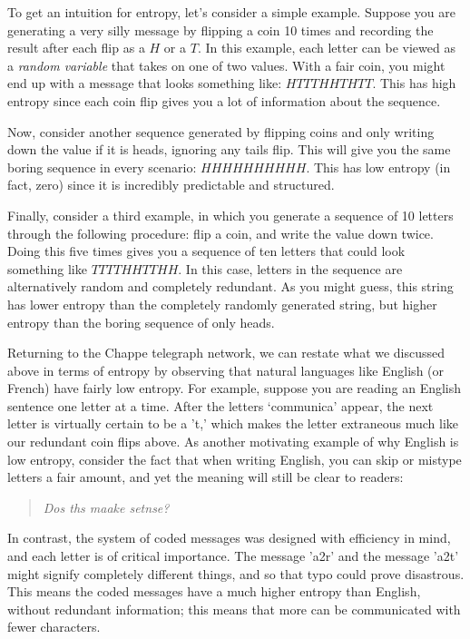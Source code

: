 \documentclass[UTF8]{book}
\begin{document}
\begin{CJK}{UTF8}{gbsn}
To get an intuition for entropy, let's consider a simple example. Suppose you are generating a very silly message by flipping a coin 10 times and recording the result after each flip as a $H$ or a $T$. In this example, each letter can be viewed as a \emph{random variable} that takes on one of two values. With a fair coin, you might end up with a message that looks something like: $HTTTHHTHTT$. This has high entropy since each coin flip gives you a lot of information about the sequence.

Now, consider another sequence generated by flipping coins and only writing down the value if it is heads, ignoring any tails flip. This will give you the same boring sequence in every scenario: $HHHHHHHHHH$. This has low entropy (in fact, zero) since it is incredibly predictable and structured.

Finally, consider a third example, in which you generate a sequence of 10 letters through the following procedure: flip a coin, and write the value down twice. Doing this five times gives you a sequence of ten letters that could look something like $TTTTHHTTHH$. In this case, letters in the sequence are alternatively random and completely redundant. As you might guess, this string has lower entropy than the completely randomly generated string, but higher entropy than the boring sequence of only heads.

Returning to the Chappe telegraph network, we can restate what we discussed above in terms of entropy by observing that natural languages like English (or French) have fairly low entropy. For example, suppose you are reading an English sentence one letter at a time. After the letters `communica' appear, the next letter is virtually certain to be a 't,' which makes the letter extraneous much like our redundant coin flips above. As another motivating example of why English is low entropy, consider the fact that when writing English, you can skip or mistype letters a fair amount, and yet the meaning will still be clear to readers:

\begin{quotation}
\centering
\emph{Dos ths maake setnse?}
\end{quotation}

In contrast, the system of coded messages was designed with efficiency in mind, and each letter is of critical importance. The message 'a2r' and the message 'a2t' might signify completely different things, and so that typo could prove disastrous. This means the coded messages have a much higher entropy than English, without redundant information; this means that more can be communicated with fewer characters.


\end{CJK}
\end{document}
